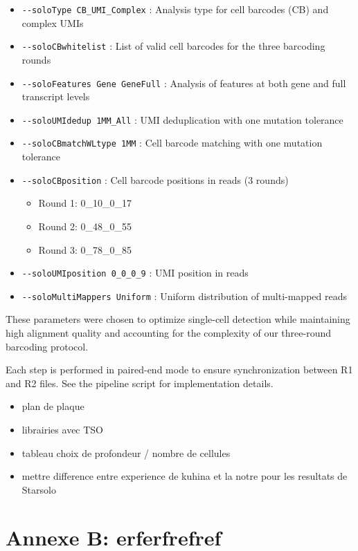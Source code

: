 \documentclass[
  11pt,
  a4paper,
]{report}
\providecommand{\tightlist}{%
  \setlength{\itemsep}{0pt}\setlength{\parskip}{0pt}}\usepackage{longtable,booktabs,array}
\begin{document}
\begin{itemize}
\tightlist
\item
  \texttt{-\/-soloType\ CB\_UMI\_Complex} : Analysis type for cell
  barcodes (CB) and complex UMIs
\item
  \texttt{-\/-soloCBwhitelist} : List of valid cell barcodes for the
  three barcoding rounds
\item
  \texttt{-\/-soloFeatures\ Gene\ GeneFull} : Analysis of features at
  both gene and full transcript levels
\item
  \texttt{-\/-soloUMIdedup\ 1MM\_All} : UMI deduplication with one
  mutation tolerance
\item
  \texttt{-\/-soloCBmatchWLtype\ 1MM} : Cell barcode matching with one
  mutation tolerance
\item
  \texttt{-\/-soloCBposition} : Cell barcode positions in reads (3
  rounds)

  \begin{itemize}
  \tightlist
  \item
    Round 1: 0\_10\_0\_17
  \item
    Round 2: 0\_48\_0\_55
  \item
    Round 3: 0\_78\_0\_85
  \end{itemize}
\item
  \texttt{-\/-soloUMIposition\ 0\_0\_0\_9} : UMI position in reads
\item
  \texttt{-\/-soloMultiMappers\ Uniform} : Uniform distribution of
  multi-mapped reads
\end{itemize}

These parameters were chosen to optimize single-cell detection while
maintaining high alignment quality and accounting for the complexity of
our three-round barcoding protocol.

Each step is performed in paired-end mode to ensure synchronization
between R1 and R2 files. See the pipeline script for implementation
details.

\begin{itemize}
\tightlist
\item
  plan de plaque
\item
  librairies avec TSO
\item
  tableau choix de profondeur / nombre de cellules
\item
  mettre difference entre experience de kuhina et la notre pour les
  resultats de Starsolo
\end{itemize}

\chapter{Annexe B: erferfrefref}\label{annexe-b}
\end{document}
